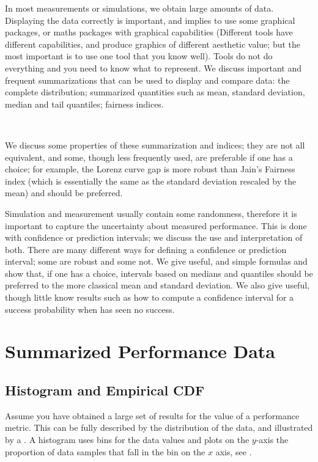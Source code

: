 \begin{minipage}[b]{0.50\textwidth}
%

In most measurements or simulations, we obtain large amounts of
data. Displaying the data correctly is important, and implies
to use some graphical packages, or maths packages with
graphical capabilities (Different tools have different
capabilities, and produce graphics of different aesthetic
value; but the most important is to use one tool that you know
well). Tools do not do everything and you need to know what to
represent. We discuss important and frequent summarizations
that can be used to display and compare data: the complete
distribution; summarized quantities such as mean, standard
deviation, median and tail quantiles; fairness indices.
\end{minipage}
%
\begin{minipage}[b]{0.50\textwidth}
\hspace{1cm} ~~~~
 ~\\
\end{minipage}
We discuss some properties of these summarization and indices;
they are not all equivalent, and some, though less frequently
used, are preferable if one has a choice; for example, the
Lorenz curve gap is more robust than Jain's Fairness index
(which is essentially the same as the standard deviation
rescaled by the mean) and should be preferred.

Simulation and measurement usually contain some randomness,
therefore it is important to capture the uncertainty about
measured performance. This is done with confidence or
prediction intervals; we discuss the use and interpretation of
both. There are many different ways for defining a confidence
or prediction interval; some are robust and some not. We give
useful, and simple formulas and show that, if one has a choice,
intervals based on medians and quantiles should be preferred to
the more classical mean and standard deviation. We also give
useful, though little know results such as how to compute a
confidence interval for a success probability when has seen no
success.

\minitoc

\section{Summarized Performance Data}
 \subsection{Histogram and Empirical CDF}
Assume you have obtained a large set of results for the value
of a performance metric. This can be fully described by the
distribution of the data, and illustrated by a .
A histogram uses bins for the data values and plots on the
$y$-axis the proportion of data samples that fall in the bin on
the $x$ axis, see .

